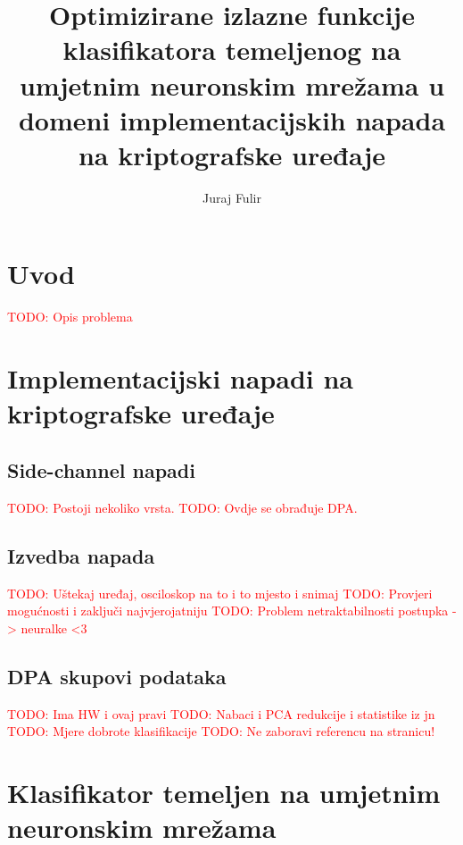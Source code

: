 \documentclass[times, utf8, diplomski]{fer}
\def\TODO#1{\noindent\textcolor{red}{TODO: #1}\newline}
\begin{document}

\title{Optimizirane izlazne funkcije klasifikatora temeljenog na umjetnim neuronskim mrežama u domeni implementacijskih napada na kriptografske uređaje}

\author{Juraj Fulir}

\maketitle

\izvornik


\tableofcontents

\chapter{Uvod}
\TODO{ Opis problema }

\chapter{Implementacijski napadi na kriptografske uređaje}

\section{Side-channel napadi}
\TODO{ Postoji nekoliko vrsta.}
\TODO{ Ovdje se obrađuje DPA.}

\section{Izvedba napada}
\TODO{ Uštekaj uređaj, osciloskop na to i to mjesto i snimaj}
\TODO{ Provjeri mogućnosti i zaključi najvjerojatniju}
\TODO{ Problem netraktabilnosti postupka -> neuralke <3}

\section{DPA skupovi podataka}
\TODO{ Ima HW i ovaj pravi}
\TODO{ Nabaci i PCA redukcije i statistike iz jn}
\TODO{ Mjere dobrote klasifikacije}
\TODO{ Ne zaboravi referencu na stranicu!}

\chapter{Klasifikator temeljen na umjetnim neuronskim mrežama}
\end{document}
